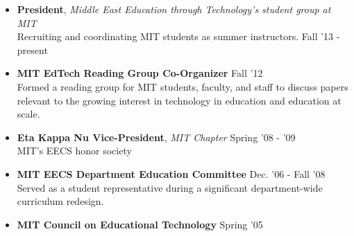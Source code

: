 \documentclass[margin]{res}
\begin{document}
\begin{resume}
\begin{itemize}[leftmargin=*]
\item {\bf President}, {\it Middle East Education through Technology's student group at MIT} \\ Recruiting and coordinating MIT students as summer instructors. \hfill Fall '13 - present %

		\item {\bf MIT EdTech Reading Group Co-Organizer} \hfill Fall '12 \\ Formed a reading group for MIT students, faculty, and staff to discuss papers relevant to the growing interest in technology in education and education at scale.

                \item {\bf Eta Kappa Nu Vice-President}, {\it MIT Chapter} \hfill Spring '08 - '09 \\ MIT's EECS honor society 


\item {\bf MIT EECS Department Education Committee} \hfill Dec. '06 - Fall '08 \\
Served as a student representative during a significant department-wide curriculum redesign.
\item {\bf MIT Council on Educational Technology} \hfill Spring '05 


 \end{itemize}
		 


          

		
		 


 
 
 



\end{resume}
\end{document}
